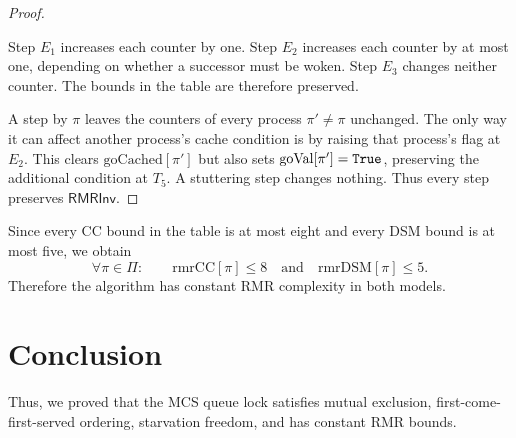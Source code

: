 \documentclass[12pt]{amsproc}
\begin{document}
\begin{proof}
\begin{itemize}
    Step $E_1$ increases each counter by one. Step $E_2$ increases each counter by at most one, depending on whether a successor must be woken. Step $E_3$ changes neither counter. The bounds in the table are therefore preserved.
\end{itemize}

A step by $\pi$ leaves the counters of every process $\pi'\ne\pi$ unchanged. The only way it can affect another process's cache condition is by raising that process's flag at $E_2$. This clears $\mathrm{goCached}[\pi']$ but also sets $\mathrm{goVal}[\pi']=\texttt{True}$, preserving the additional condition at $T_5$. A stuttering step changes nothing. Thus every step preserves $\mathsf{RMRInv}$.
\end{proof}

Since every CC bound in the table is at most eight and every
DSM bound is at most five, we obtain
\[
\forall \pi\in\Pi:\qquad
\mathrm{rmrCC}[\pi]\le 8
\quad\text{and}\quad
\mathrm{rmrDSM}[\pi]\le 5.
\]
Therefore the algorithm has constant RMR complexity in both models.

\section{Conclusion}
Thus, we proved that the MCS queue lock satisfies mutual exclusion, first-come-first-served ordering, starvation freedom, and has constant RMR bounds. 
\end{document}
